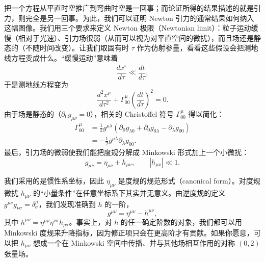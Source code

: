 把一个方程从平直时空推广到弯曲时空是一回事；而论证所得的结果描述的就是引力，则完全是另一回事。为此，我们可以证明 Newton 引力的通常结果如何纳入这幅图像。我们用三个要求来定义 Newton 极限（Newtonian limit）：粒子运动缓慢（相对于光速）、引力场很弱（从而可以视为对平直空间的微扰），而且场还是静态的（不随时间改变）。让我们取固有时 $\tau$ 作为仿射参量，看看这些假设会把测地线方程变成什么。“缓慢运动”意味着
\begin{equation*}
\frac{dx^i}{d\tau} \ll \frac{dt}{d\tau},
\tag{4.9}
\end{equation*}
于是测地线方程变为
\begin{equation*}
\frac{d^2x^\mu}{d\tau^2} + \Gamma^\mu_{00}\left(\frac{dt}{d\tau}\right)^2 = 0.
\tag{4.10}
\end{equation*}
由于场是静态的（$\partial_0 g_{\mu\nu}=0$），相关的 Christoffel 符号 $\Gamma^\mu_{00}$ 得以简化：
\begin{align*}
\Gamma^\mu_{00} &= \frac{1}{2}g^{\mu\lambda}\left(\partial_0 g_{\lambda 0} + \partial_0 g_{0\lambda} - \partial_\lambda g_{00}\right) \\
&= -\frac{1}{2}g^{\mu\lambda}\partial_\lambda g_{00}.
\tag{4.11}
\end{align*}
最后，引力场的微弱使我们能把度规分解成 Minkowski 形式加上一个小微扰：
\begin{equation*}
g_{\mu\nu} = \eta_{\mu\nu} + h_{\mu\nu}, \qquad |h_{\mu\nu}| \ll 1.
\tag{4.12}
\end{equation*}

我们采用的是惯性系坐标，因此 $\eta_{\mu\nu}$ 是度规的规范形式（canonical form）。对度规微扰 $h_{\mu\nu}$ 的“小量条件”在任意坐标系下其实并无意义。由逆度规的定义 $g^{\mu\nu}g_{\nu\sigma}=\delta^\mu_\sigma$，我们发现准确到 $h$ 的一阶，
\begin{equation*}
g^{\mu\nu} = \eta^{\mu\nu} - h^{\mu\nu},
\tag{4.13}
\end{equation*}
其中 $h^{\mu\nu} = \eta^{\mu\rho}\eta^{\nu\sigma}h_{\rho\sigma}$。事实上，对 $h$ 的任一确定阶数的对象，我们都可以用 Minkowski 度规来升降指标，因为修正项只会在更高阶才有贡献。如果你愿意，可以把 $h_{\mu\nu}$ 想成一个在 Minkowski 空间中传播、并与其他场相互作用的对称 $(0,2)$ 张量场。

